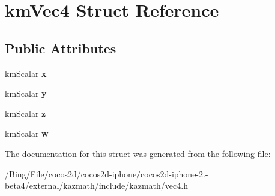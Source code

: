 \hypertarget{structkm_vec4}{\section{km\-Vec4 Struct Reference}
\label{structkm_vec4}
}
\subsection*{Public Attributes}
\begin{DoxyCompactItemize}
\item 
\hypertarget{structkm_vec4_a2f05daa4b1ff4cdb6f5340d0ff28c6ac}{km\-Scalar {\bfseries x}}\label{structkm_vec4_a2f05daa4b1ff4cdb6f5340d0ff28c6ac}

\item 
\hypertarget{structkm_vec4_a166ea934d56eca30a97b190d365b62b8}{km\-Scalar {\bfseries y}}\label{structkm_vec4_a166ea934d56eca30a97b190d365b62b8}

\item 
\hypertarget{structkm_vec4_af4e022632723b68a304ac40d308cceab}{km\-Scalar {\bfseries z}}\label{structkm_vec4_af4e022632723b68a304ac40d308cceab}

\item 
\hypertarget{structkm_vec4_ab002db65c3793806ec266f2cc348879f}{km\-Scalar {\bfseries w}}\label{structkm_vec4_ab002db65c3793806ec266f2cc348879f}

\end{DoxyCompactItemize}


The documentation for this struct was generated from the following file\-:\begin{DoxyCompactItemize}
\item 
/\-Bing/\-File/cocos2d/cocos2d-\/iphone/cocos2d-\/iphone-\/2.-\/beta4/external/kazmath/include/kazmath/vec4.\-h\end{DoxyCompactItemize}
